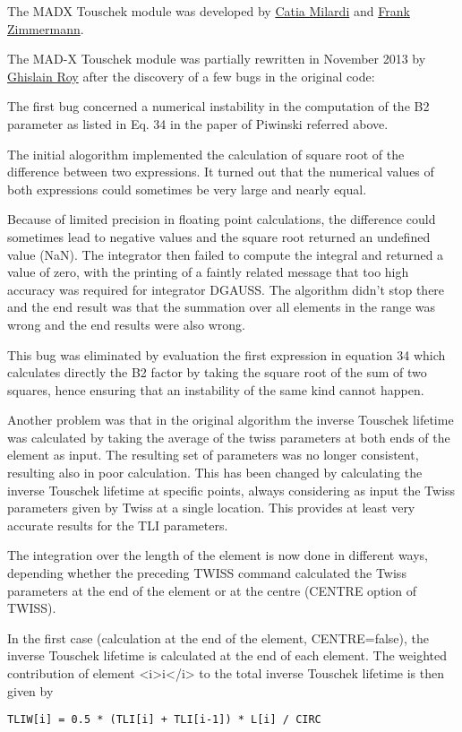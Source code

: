 The MADX Touschek module was developed by
\href{mailto:catia.milardi@lnf.infn.it}{Catia Milardi} and 
\href{mailto:frank.zimmermann@cern.ch}{Frank Zimmermann}.

The MAD-X Touschek module was partially rewritten in November 2013 by
\href{mailto:ghislain.roy@cern.ch}{Ghislain Roy}  
after the discovery of a few bugs in the original code:

The first bug concerned a numerical instability in the computation of
the B2 parameter as listed in Eq. 34 in the paper of Piwinski referred
above.  

The initial alogorithm implemented the calculation of square root of the
difference between two expressions. It turned out that the numerical
values of both expressions could sometimes be very large and nearly
equal.
  
Because of limited precision in floating point calculations, the
difference could sometimes lead to negative values  
and the square root returned an undefined value (NaN). 
The integrator then failed to compute the integral and returned a value
of zero, with the printing of a faintly related  
message that too high accuracy was required for integrator DGAUSS. 
The algorithm didn't stop there and the end result was that the
summation over all elements in the range was wrong 
and the end results were also wrong.

This bug was eliminated by evaluation the first expression in equation
34 which calculates directly the B2 factor by taking the square root of
the sum of two squares, hence ensuring that an instability of the same
kind cannot happen.  

Another problem was that in the original algorithm the inverse Touschek
lifetime was calculated by taking the average of the twiss parameters at
both ends of the element as input. The resulting set of parameters was
no longer consistent, resulting also in poor calculation. This has been
changed by calculating the inverse Touschek lifetime at specific points,  
always considering as input the Twiss parameters given by Twiss at a
single location. This provides at least very accurate results for the
TLI parameters. 

The integration over the length of the element is now done in different
ways, depending whether the preceding TWISS command calculated the Twiss
parameters at the end of the element or at the centre (CENTRE option of
TWISS).  

In the first case (calculation at the end of the element, CENTRE=false), 
the inverse Touschek lifetime is calculated at the end of each element. 
The weighted contribution of element <i>i</i> to the total inverse
Touschek lifetime is then given by 
\begin{verbatim}
TLIW[i] = 0.5 * (TLI[i] + TLI[i-1]) * L[i] / CIRC
\end{verbatim}


